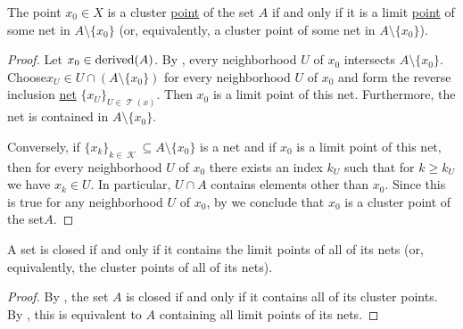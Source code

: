 \begin{proposition}\label{thm:cluster_point_of_set_iff_limit_point_of_net}
  The point \( x_0 \in X \) is a cluster \hyperref[def:topological_derived_set/cluster_point]{point} of the set \( A \) if and only if it is a limit \hyperref[def:net_convergence/cluster]{point} of some net in \( A \setminus \{ x_0 \} \) (or, equivalently, a cluster point of some net in \( A \setminus \{ x_0 \} \)).
\end{proposition}
\begin{proof}
  \SufficiencySubProof Let \( x_0 \in \operatorname{derived}(A) \). By , every neighborhood \( U \) of \( x_0 \) intersects \( A \setminus \{ x_0 \} \). Choose\DNE \( x_U \in U \cap (A \setminus \{ x_0 \}) \) for every neighborhood \( U \) of \( x_0 \) and form the reverse inclusion \hyperref[ex:reverse_inclusion_net]{net} \( \{ x_U \}_{U \in \mscrT(x)} \). Then \( x_0 \) is a limit point of this net. Furthermore, the net is contained in \( A \setminus \{ x_0 \} \).

  \NecessitySubProof Conversely, if \( \{ x_k \}_{k \in \mscrK} \subseteq A \setminus \{ x_0 \} \) is a net and if \( x_0 \) is a limit point of this net, then for every neighborhood \( U \) of \( x_0 \) there exists an index \( k_U \) such that for \( k \geq k_U \) we have \(  x_k \in U \). In particular, \( U \cap A \) contains elements other than \( x_0 \). Since this is true for any neighborhood \( U \) of \( x_0 \), by  we conclude that \( x_0 \) is a cluster point of the set\( A \).
\end{proof}

\begin{corollary}\label{thm:closed_iff_contains_all_net_cluster_points}
  A set is closed if and only if it contains the limit points of all of its nets (or, equivalently, the cluster points of all of its nets).
\end{corollary}
\begin{proof}
  By , the set \( A \) is closed if and only if it contains all of its cluster points. By , this is equivalent to \( A \) containing all limit points of its nets.
\end{proof}

